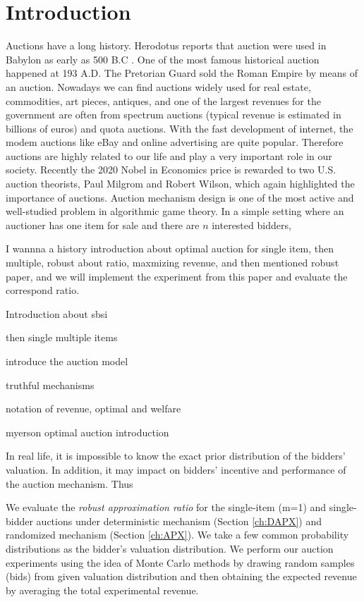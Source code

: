 \chapter{Introduction}
\label{ch:introduction}
Auctions have a long history. Herodotus reports that auction were used in Babylon as early as 500 B.C \cite{krishna2009auction}. One of the most famous historical auction happened at 193 A.D. The Pretorian Guard sold the Roman Empire by means of an auction\cite{krishna2009auction}. Nowadays we can find auctions widely used for real estate, commodities, art pieces, antiques, and one of the largest revenues for the government are often from spectrum auctions (typical revenue is estimated in billions of euros) and quota auctions. With the fast development of internet, the modem auctions like eBay and online advertising are quite popular. Therefore auctions are highly related to our life and play a very important role in our society. Recently the 2020 Nobel in Economics price is rewarded to two U.S. auction theorists, Paul Milgrom and Robert Wilson, which again highlighted the importance of auctions. 
Auction mechanism design is one of the most active and well-studied problem in algorithmic game theory. In a simple setting where an auctioner has one item for sale and there are $n$ interested bidders,   

I wannna a history introduction about optimal auction for single item, then multiple, robust about ratio, maxmizing revenue, and then mentioned robust paper, and we will implement the experiment from this paper and evaluate the correspond ratio. 


Introduction about sbsi

then single multiple items

introduce the auction model 

truthful mechanisms

notation of revenue, optimal and welfare

myerson optimal auction introduction


In real life, it is impossible to know the exact prior distribution of the bidders' valuation. In addition, it may impact on bidders' incentive and performance of the auction mechanism. Thus 


We evaluate the \textit{robust approximation ratio} for the single-item (m=1) and single-bidder auctions under deterministic mechanism (Section \ref{ch:DAPX}) and randomized mechanism (Section \ref{ch:APX}). We take a few common probability distributions as the bidder's valuation distribution. We perform our auction experiments using the idea of Monte Carlo methods by drawing random samples (bids) from given valuation distribution and then obtaining the expected revenue by averaging the total experimental revenue.

